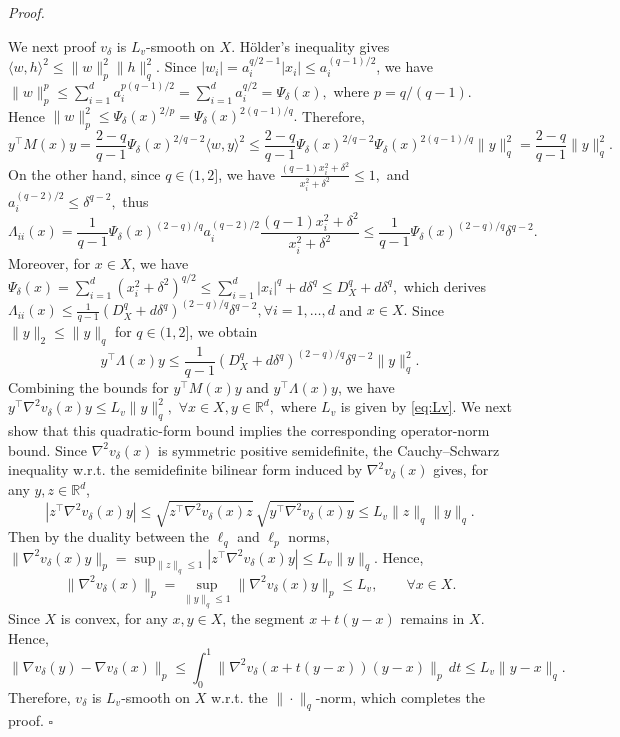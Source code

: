 \documentclass[11pt]{article}
\newenvironment{proof}[1][Proof]{%
    \par\noindent\textit{#1.}\enspace
  }{%
    \hfill\ensuremath{\square}\par
  }%
\numberwithin{equation}{section}
\begin{document}
\begin{proof}
We next proof $v_\delta$ is \(L_v\)-smooth on $X$.
 H\"older's inequality gives
\(
    \langle w,h\rangle^2
    \le
    \|w\|_p^2\|h\|_q^2.
\) 
Since \(|w_i|=a_i^{q/2-1}|x_i|\le a_i^{(q-1)/2}\), we have \(\|w\|_p^p\le\sum_{i=1}^d a_i^{p(q-1)/2}=\sum_{i=1}^d a_i^{q/2}=\Psi_\delta(x),\) where $p=q/(q-1)$. Hence \(\|w\|_p^2\le\Psi_\delta(x)^{2/p}=\Psi_\delta(x)^{2(q-1)/q}.\) Therefore,
\[
    y^\top M(x)y
    =
    \frac{2-q}{q-1}
 \Psi_\delta(x)^{2/q-2}
    \langle w,y\rangle^2  
    \le
    \frac{2-q}{q-1}   \Psi_\delta(x)^{2/q-2}    \Psi_\delta(x)^{2(q-1)/q}
    \|y\|_q^2        =
    \frac{2-q}{q-1}\|y\|_q^2 .
\]
On the other hand, since $q\in(1,2]$, we have \(\frac{(q-1)x_i^2+\delta^2}{x_i^2+\delta^2}\le 1,\) and \(a_i^{(q-2)/2}\le\delta^{q-2},\) thus
\[
    \Lambda_{ii}(x)
    =
    \frac{1}{q-1}
    \Psi_\delta(x)^{(2-q)/q}
    a_i^{(q-2)/2}
    \frac{(q-1)x_i^2+\delta^2}{x_i^2+\delta^2}              \le
    \frac{1}{q-1}
    \Psi_\delta(x)^{(2-q)/q}
    \delta^{q-2}.
\]
Moreover, for $x\in X$, we have \(\Psi_\delta(x)=\sum_{i=1}^d (x_i^2+\delta^2)^{q/2}\le\sum_{i=1}^d |x_i|^q+d\delta^q\le D_X^q+d\delta^q ,\) which derives
\(    \Lambda_{ii}(x)
    \le
    \frac{1}{q-1}
    (D_X^q+d\delta^q)^{(2-q)/q}\delta^{q-2}, \forall i=1,\ldots,d\) and \(x\in X.
\) 
Since $\|y\|_2\le \|y\|_q$ for $q\in(1,2]$, we obtain \[y^\top \Lambda(x)y\le\frac{1}{q-1}(D_X^q+d\delta^q)^{(2-q)/q}\delta^{q-2}\|y\|_q^2 .\]
Combining the bounds for $y^\top M(x)y$ and $y^\top \Lambda(x)y$, we have
\(
    y^\top \nabla^2 v_\delta(x)y
    \le
    L_{v}\|y\|_q^2,
    \) \(\forall x\in X,  y\in\mathbb R^d,
\)
where $L_v$ is given by \eqref{eq:Lv}.
We next show that this quadratic-form bound implies the corresponding
operator-norm bound. Since $\nabla^2 v_\delta(x)$ is symmetric positive
semidefinite, the Cauchy--Schwarz inequality w.r.t. the
semidefinite bilinear form induced by $\nabla^2 v_\delta(x)$ gives, for
any $y,z\in\mathbb{R}^d$,
\[
    |z^\top \nabla^2 v_\delta(x) y|
    \le
    \sqrt{z^\top \nabla^2 v_\delta(x) z}\,
    \sqrt{y^\top \nabla^2 v_\delta(x) y} 
    \le
    L_v \|z\|_q \|y\|_q .
\]
Then by the duality between the $\ell_q$ and $\ell_p$ norms,
\(\|\nabla^2 v_\delta(x)y\|_p
    = \sup_{\|z\|_q\le 1}
       |z^\top \nabla^2 v_\delta(x)y| 
    \le L_v\|y\|_q .\)
Hence,
\[
    \|\nabla^2 v_\delta(x)\|_p
    =\sup_{\|y\|_q\le1}
      \|\nabla^2 v_\delta(x)y\|_p
    \le L_v,
    \qquad \forall x\in X.
\]
Since $X$ is convex, for any $x,y\in X$, the segment $x+t(y-x)$ remains in $X$. Hence,
\[\|\nabla v_\delta(y)-\nabla v_\delta(x)\|_p\le\int_0^1\|\nabla^2v_\delta(x+t(y-x))(y-x)\|_p\,dt \le L_{v}\|y-x\|_q .\]
Therefore, $v_\delta$ is $L_{v}$-smooth on $X$ w.r.t. the $\|\cdot\|_q$-norm, which completes the proof.
\end{proof}
\end{document}
